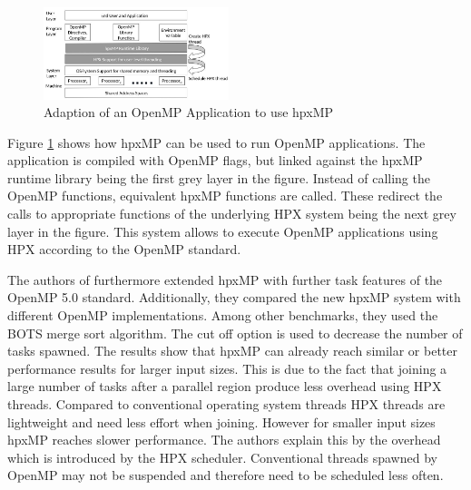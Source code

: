   \begin{figure}[htbp]
	\centering
	\includegraphics[width=0.48\textwidth]{figures/hpxMP.JPG}
	\caption{Adaption of an OpenMP Application to use hpxMP~\cite{hpxMP.2019}}
	\label{fig:hpxMP}
  \end{figure}
  
  Figure \ref{fig:hpxMP} shows how hpxMP can be used to run OpenMP applications.
  The application is compiled with OpenMP flags, but linked against the hpxMP runtime library being the first grey layer in the figure.
  Instead of calling the OpenMP functions, equivalent hpxMP functions are called.
  These redirect the calls to appropriate functions of the underlying HPX system being the next grey layer in the figure.
  This system allows to execute OpenMP applications using HPX according to the OpenMP standard.
  
  The authors of \cite{Zhang.2192020} furthermore extended hpxMP with further task features of the OpenMP 5.0 standard.
  Additionally, they compared the new hpxMP system with different OpenMP implementations.
  Among other benchmarks, they used the BOTS merge sort algorithm.
  The cut off option is used to decrease the number of tasks spawned.
  The results show that hpxMP can already reach similar or better performance results for larger input sizes.
  This is due to the fact that joining a large number of tasks after a parallel region produce less overhead using HPX threads.
  Compared to conventional operating system threads HPX threads are lightweight and need less effort when joining.
  However for smaller input sizes hpxMP reaches slower performance.
  The authors explain this by the overhead which is introduced by the HPX scheduler.
  Conventional threads spawned by OpenMP may not be suspended and therefore need to be scheduled less often.
  